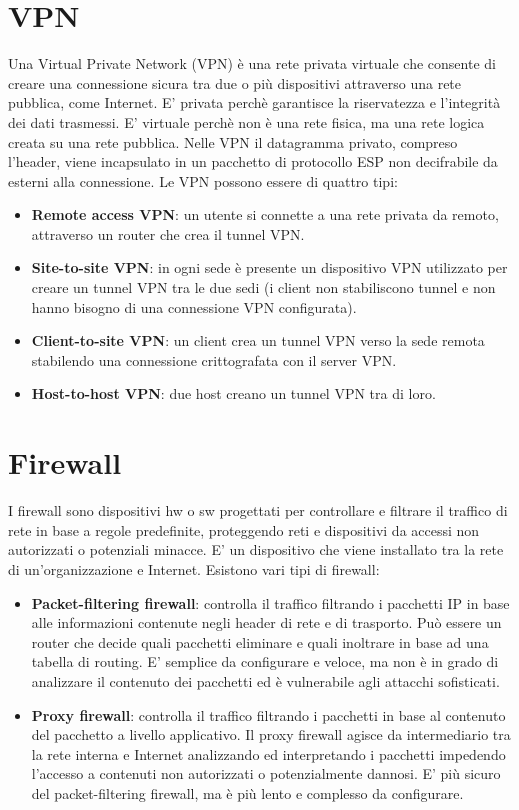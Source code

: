 \documentclass[12pt]{report}
\begin{document}
\section{VPN}
Una Virtual Private Network (VPN) è una rete privata virtuale che consente di creare una connessione sicura tra due o più dispositivi attraverso una rete pubblica, come Internet. E' privata perchè garantisce la riservatezza e l'integrità dei dati trasmessi. E' virtuale perchè non è una rete fisica, ma una rete logica creata su una rete pubblica. Nelle VPN il datagramma privato, compreso l'header, viene incapsulato in un pacchetto di protocollo ESP non decifrabile da esterni alla connessione. Le VPN possono essere di quattro tipi:
\begin{itemize}
    \item \textbf{Remote access VPN}: un utente si connette a una rete privata da remoto, attraverso un router che crea il tunnel VPN.
    \item \textbf{Site-to-site VPN}: in ogni sede è presente un dispositivo VPN utilizzato per creare un tunnel VPN tra le due sedi (i client non stabiliscono tunnel e non hanno bisogno di una connessione VPN configurata).
    \item \textbf{Client-to-site VPN}: un client crea un tunnel VPN verso la sede remota stabilendo una connessione crittografata con il server VPN.
    \item \textbf{Host-to-host VPN}: due host creano un tunnel VPN tra di loro.
\end{itemize}


\section{Firewall}
I firewall sono dispositivi hw o sw progettati per controllare e filtrare il traffico di rete in base a regole predefinite, proteggendo reti e dispositivi da accessi non autorizzati o potenziali minacce. E' un dispositivo che viene installato tra la rete di un'organizzazione e Internet. Esistono vari tipi di firewall:
\begin{itemize}
	\item \textbf{Packet-filtering firewall}: controlla il traffico filtrando i pacchetti IP in base alle informazioni contenute negli header di rete e di trasporto. Può essere un router che decide quali pacchetti eliminare e quali inoltrare in base ad una tabella di routing. E' semplice da configurare e veloce, ma non è in grado di analizzare il contenuto dei pacchetti ed è vulnerabile agli attacchi sofisticati.
	\item \textbf{Proxy firewall}: controlla il traffico filtrando i pacchetti in base al contenuto del pacchetto a livello applicativo. Il proxy firewall agisce da intermediario tra la rete interna e Internet analizzando ed interpretando i pacchetti impedendo l'accesso a contenuti non autorizzati o potenzialmente dannosi. E' più sicuro del packet-filtering firewall, ma è più lento e complesso da configurare.
\end{itemize}
\end{document}
